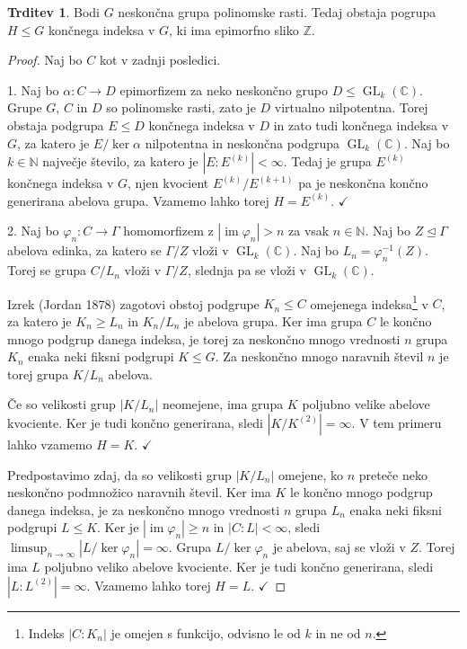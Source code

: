 \documentclass[11pt]{book}
\def\NN{\mathbb{N}}
\def\ZZ{\mathbb{Z}}
\def\CC{\mathbb{C}}
\DeclareMathOperator\image{im}
\DeclareMathOperator\GL{GL}
\def\literatura{\color{modra}}
\def\kljuka{$\checkmark$}
\theoremstyle{definition}
\theoremstyle{zgled}
\theoremstyle{odprtproblem}
\theoremstyle{domacanaloga}
\newenvironment{dokaz}
    {\color{siva}\begin{proof}}
    {\end{proof}}
\theoremstyle{izrek}
\newtheorem*{trditev}{Trditev}
\begin{document}
\begin{trditev}
Bodi $G$ neskončna grupa polinomske rasti. Tedaj obstaja pogrupa $H \leq G$ končnega indeksa v $G$, ki ima epimorfno sliko $\ZZ$.
\end{trditev}

\begin{dokaz}
Naj bo $C$ kot v zadnji posledici.

1. Naj bo $\alpha \colon C \to D$ epimorfizem za neko neskončno grupo $D \leq \GL_k(\CC)$. Grupe $G$, $C$ in $D$ so polinomske rasti, zato je $D$ virtualno nilpotentna. Torej obstaja podgrupa $E \leq D$ končnega indeksa v $D$ in zato tudi končnega indeksa v $G$, za katero je $E/\ker \alpha$ nilpotentna in neskončna podgrupa $\GL_k(\CC)$. Naj bo $k \in \NN$ največje število, za katero je $|E : E^{(k)}| < \infty$. Tedaj je grupa $E^{(k)}$ končnega indeksa v $G$, njen kvocient $E^{(k)}/E^{(k+1)}$ pa je neskončna končno generirana abelova grupa. Vzamemo lahko torej $H = E^{(k)}$. \kljuka

2. Naj bo $\varphi_n \colon C \to \Gamma$ homomorfizem z $|\image \varphi_n| > n$ za vsak $n \in \NN$. Naj bo $Z \unlhd \Gamma$ abelova edinka, za katero se $\Gamma/Z$ vloži v $\GL_k(\CC)$. Naj bo $L_n = \varphi_n^{-1}(Z)$. Torej se grupa $C/L_n$ vloži v $\Gamma/Z$, slednja pa se vloži v $\GL_k(\CC)$. 

Izrek {\literatura (Jordan 1878)} zagotovi obstoj podgrupe $K_n \leq C$ omejenega indeksa\footnote{Indeks $|C : K_n|$ je omejen s funkcijo, odvisno le od $k$ in ne od $n$.} v $C$, za katero je $K_n \geq L_n$ in $K_n/L_n$ je abelova grupa. Ker ima grupa $C$ le končno mnogo podgrup danega indeksa, je torej za neskončno mnogo vrednosti $n$ grupa $K_n$ enaka neki fiksni podgrupi $K \leq G$. Za neskončno mnogo naravnih števil $n$ je torej grupa $K/L_n$ abelova. 

Če so velikosti grup $|K/L_n|$ neomejene, ima grupa $K$ poljubno velike abelove kvociente. Ker je tudi končno generirana, sledi $|K/K^{(2)}| = \infty$. V tem primeru lahko vzamemo $H = K$. \kljuka 

Predpostavimo zdaj, da so velikosti grup $|K/L_n|$ omejene, ko $n$ preteče neko neskončno podmnožico naravnih števil. Ker ima $K$ le končno mnogo podgrup danega indeksa, je za neskončno mnogo vrednosti $n$ grupa $L_n$ enaka neki fiksni podgrupi $L \leq K$. Ker je $|\image \varphi_n| \geq n$ in $|C : L| < \infty$, sledi $\limsup_{n \to \infty} |L/\ker \varphi_n| = \infty$. Grupa $L/ \ker \varphi_n$ je abelova, saj se vloži v $Z$. Torej ima $L$ poljubno veliko abelove kvociente. Ker je tudi končno generirana, sledi $|L:L^{(2)}| = \infty$. Vzamemo lahko torej $H = L$. \kljuka
\end{dokaz}
\end{document}
